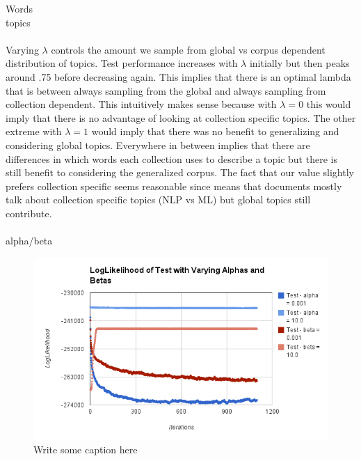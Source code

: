 \documentclass[12pt]{article}
\begin{document}
 Words \\
 topics \\
\\
 Varying $\lambda$ controls the amount we sample from global vs corpus dependent distribution of topics. Test performance increases with $\lambda$ initially but then peaks around .75 before decreasing again. This implies that there is an optimal lambda that is between always sampling from the global and always sampling from collection dependent. This intuitively makes sense because with $\lambda = 0$ this would imply that there is no advantage of looking at collection specific topics. The other extreme with $\lambda=1$ would imply that there was no benefit to generalizing and considering global topics. Everywhere in between implies that there are differences in which words each collection uses to describe a topic but there is still benefit to considering the generalized corpus. The fact that our value slightly prefers collection specific seems reasonable since means that documents mostly talk about collection specific topics (NLP vs ML) but global topics still contribute. 
 \\
\\
 alpha/beta \\

\begin{figure}[H]
\centering
\includegraphics[keepaspectratio=true,scale=0.8]{charts/VaryingAlphasBetasOnTest}
\caption{Write some caption here}\label{alphaBetaVariation}
\end{figure}

\end{document}
